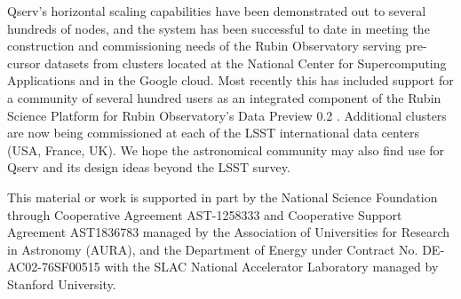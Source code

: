 \documentclass[11pt,twoside]{article}
\begin{document}
Qserv's horizontal scaling capabilities have been demonstrated out to several hundreds of nodes, and the
system has been successful to date in meeting the construction and commissioning needs of the Rubin
Observatory serving pre-cursor datasets from clusters located at the National Center for Supercomputing
Applications and in the Google cloud.  Most recently this has included support for a community of several
hundred users as an integrated component of the Rubin Science Platform for Rubin Observatory's Data Preview
0.2 \citep{RTN-041}. Additional clusters are now being commissioned at each of the LSST international data
centers (USA, France, UK).  We hope the astronomical community may also find use for Qserv and its design
ideas beyond the LSST survey.

\acknowledgements This material or work is supported in part by the National Science Foundation through
Cooperative Agreement AST-1258333 and Cooperative Support Agreement AST1836783 managed by the Association of
Universities for Research in Astronomy (AURA), and the Department of Energy under Contract No.
DE-AC02-76SF00515 with the SLAC National Accelerator Laboratory managed by Stanford University.


\end{document}

